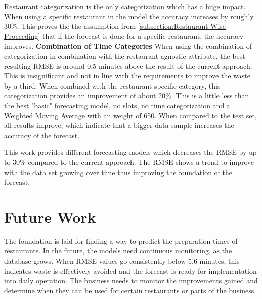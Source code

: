 Restaurant categorization is the only categorization which has a huge impact. When using a specific restaurant in the model the accuracy increases by roughly 30\%. This proves the the assumption from \ref{subsection:Restaurant Wise Proceeding} that if the forecast is done for a specific restaurant, the accuracy improves.
\newline\newline\textbf{Combination of Time Categories}\newline
When using the combination of categorization in combination with the restaurant agnostic attribute, the best resulting RMSE is around 0.5 minutes above the result of the current approach. This is insignificant and not in line with the requirements to improve the waste by a third.\newline
When combined with the restaurant specific category, this categorization provides an improvement of about 20\%. This is a little less than the best "basic" forecasting model, no slots, no time categorization and a Weighted Moving Average with an weight of 650. When compared to the test set, all results improve, which indicate that a bigger data sample increases the accuracy of the forecast.

\newline\newline
This work provides different forecasting models which decreases the RMSE by up to 30\% compared to the current approach. The RMSE shows a trend to improve with the data set growing over time thus improving the foundation of the forecast.
\section{Future Work}
The foundation is laid for finding a way to predict the preparation times of restaurants. In the future, the models need continuous monitoring, as the database grows. When RMSE values go consistently below 5.6 minutes, this indicates waste is effectively avoided and the forecast is ready for implementation into daily operation.\newline
The business needs to monitor the improvements gained and determine when they can be used for certain restaurants or parts of the business.
